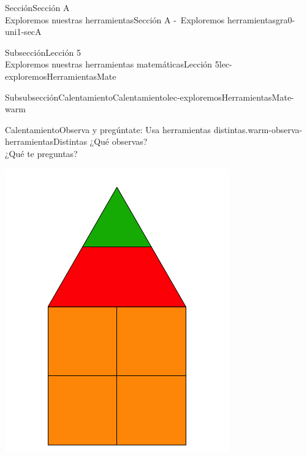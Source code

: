 \begin{sectionptx}{Sección}{{\Large Sección A\\}Exploremos nuestras herramientas}{}{Sección A -~Exploremos herramientas}{}{}{gra0-uni1-secA}
\begin{subsectionptx}{Subsección}{{\normalsize Lección 5\\[-0.05cm]}Exploremos nuestras herramientas matemáticas}{}{Lección 5}{}{}{lec-exploremosHerramientasMate}
%
%
\typeout{************************************************}
\typeout{************************************************}
%
\begin{subsubsectionptx}{Subsubsección}{Calentamiento}{}{Calentamiento}{}{}{lec-exploremosHerramientasMate-warm}
\begin{exploration}{Calentamiento}{Observa y pregúntate: Usa herramientas distintas.}{warm-observa-herramientasDistintas}%
¿Qué observas?\\
 ¿Qué te preguntas?%
\begin{sidebyside}{2}{0.05}{0.05}{0.1}%
\begin{sbspanel}{0.4}%
\includegraphics[max width=\linewidth, center]{external/svg-source/tikz-file-148145.pdf}
\end{sbspanel}%
\begin{sbspanel}{0.4}%

\end{sbspanel}
\end{sidebyside}
\end{exploration}
\end{subsubsectionptx}
\end{subsectionptx}
\end{sectionptx}
